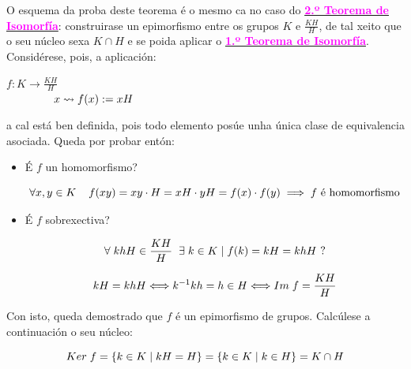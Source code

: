 \documentclass[twoside]{report}
\newcommand{\magbf}[1]{\textcolor{magenta}{\textbf{#1}}} %
\theoremstyle{mystyle}
\begin{document}
\vspace{3mm}

\noindent O esquema da proba deste teorema é o mesmo ca no caso do \hyperref[th1.6]{\magbf{2.º Teorema de Isomorfía}}: construirase un epimorfismo entre os grupos $K$ e $\displaystyle \frac{KH}{H}$, de tal xeito que o seu núcleo sexa $K \cap H$ e se poida aplicar o \hyperref[th1.5]{\magbf{1.º Teorema de Isomorfía}}.\\

\noindent Considérese, pois, a aplicación: 

    \begin{center}
            $f: \displaystyle K \longrightarrow \displaystyle \frac{KH}{H}$ \\
        \vspace{2mm}
        $\hspace{15mm} x \leadsto f(x) := xH$
    \end{center} 
    
\noindent a cal está ben definida, pois todo elemento posúe unha única clase de equivalencia asociada. Queda por probar entón: 

\begin{itemize}
    
    \item É $f$ un homomorfismo?
    
    $$\forall x,y \in K \hspace{4mm} f(xy) = xy \cdot H = xH \cdot yH = f(x) \cdot f(y) \implies f\text{ é homomorfismo}$$  
    
    \item É $f$ sobrexectiva?

    $$\forall \hspace{1mm} khH \in \displaystyle \frac{KH}{H} \hspace{2mm} \exists \hspace{1mm} k \in K \hspace{1mm} | \hspace{1mm} f(k) = kH = khH \text{ ?}$$    
    
    $$kH = khH \Longleftrightarrow k^{-1}kh = h \in H \Longleftrightarrow Im \hspace{1mm} f = \displaystyle \frac{KH}{H}$$
    
\end{itemize}

\noindent Con isto, queda demostrado que $f$ é un epimorfismo de grupos. Calcúlese a continuación o seu núcleo: 

$$Ker \hspace{1mm} f = \{ k \in K \hspace{1mm} | \hspace{1mm} kH = H \} = \{k \in K \hspace{1mm} | \hspace{1mm} k \in H \} = K \cap H$$
\end{document}

